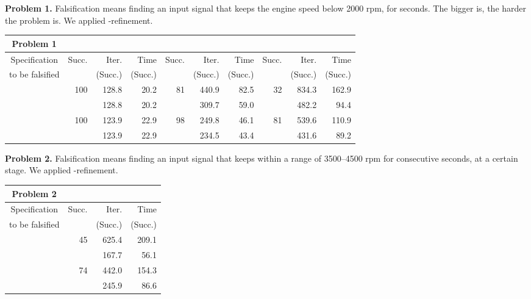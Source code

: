 \documentclass[envcountsect,orivec]{llncs} \usepackage{etex} \usepackage[]{graphicx}
\newcommand{\Succ}{Succ.}
\begin{document}
\begin{table}[ptb]
  \scriptsize
  \centering
  \begin{minipage}{\textwidth}
    \textbf{Problem 1. } Falsification means finding an input signal 
    that keeps the engine speed  below 2000 rpm, for 
    seconds. The bigger  is, the harder the problem is.
    We applied -refinement.
  \end{minipage}
  \begin{tabular}{c||r|r|r|r|r|r|r|r|r}
    \textbf{Problem 1}
    &\multicolumn{3}{|c|}{} &\multicolumn{3}{|c|}{} &\multicolumn{3}{|c}{}\\ \hline
    Specification & \Succ & Iter. & Time & \Succ & Iter. & Time &
    \Succ & Iter. & Time \\
    to be falsified
    &  & (\Succ) & (\Succ) & & (\Succ) & (\Succ)&  & (\Succ) & (\Succ)\\  \hline\hline
     
    & 100& 128.8& 20.2& 81& 440.9& 82.5& 32& 834.3& 162.9\\
    &    & 128.8& 20.2&   & 309.7& 59.0&   & 482.2&  94.4\\\hline
    
    & 100& 123.9& 22.9& 98& 249.8& 46.1 & 81& 539.6& 110.9\\
    &    & 123.9& 22.9&   & 234.5& 43.4 &   & 431.6&  89.2\\
  \end{tabular}

  \vspace{1em}
  \begin{minipage}{\textwidth}
\textbf{Problem 2.} Falsification means finding an input signal 
    that keeps  within a range of 3500--4500 rpm for 
    consecutive seconds, at a certain stage. 
We applied -refinement.
  \end{minipage}
  \begin{tabular}{c||r|r|r}
    \textbf{Problem 2}
    &\multicolumn{3}{|c}{} \\ \hline
    Specification & \Succ & Iter. & Time\\
    to be falsified
    &  & (\Succ) & (\Succ) \\  \hline\hline
    
    & 45& 625.4& 209.1\\
    &   & 167.7&  56.1\\\hline
    
    & 74& 442.0&  154.3\\
    &   & 245.9&   86.6\\
  \end{tabular}


\end{table}
\end{document}
